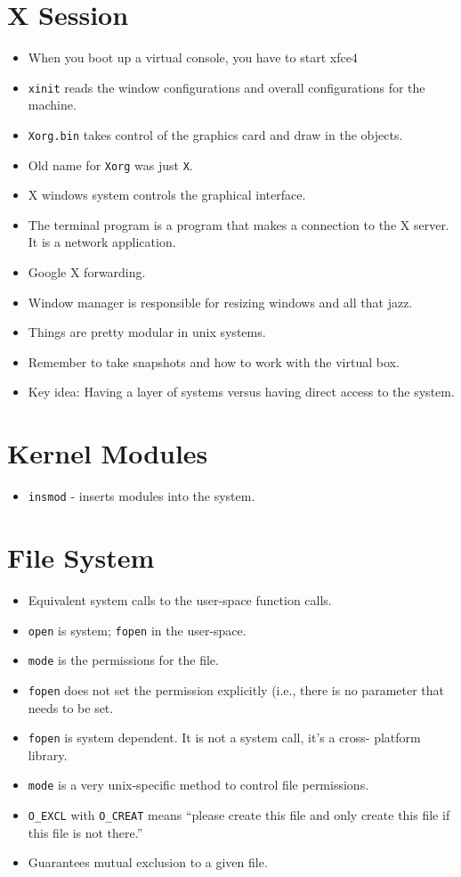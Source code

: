 \documentclass[]{article}
\newcommand{\code}{\texttt}
\begin{document}
\section*{X Session}
\begin{itemize}
\item When you boot up a virtual console, you have to start xfce4
\item \code{xinit} reads the window configurations and overall configurations
for the machine.
\item \code{Xorg.bin} takes control of the graphics card and draw in the
objects.
\item Old name for \code{Xorg} was just \code{X}.
\item X windows system controls the graphical interface.
\item The terminal program is a program that makes a connection to the X server.
It is a network application.
\item Google X forwarding.
\item Window manager is responsible for resizing windows and all that jazz.
\item Things are pretty modular in unix systems.
\item Remember to take snapshots and how to work with the virtual box.
\item Key idea: Having a layer of systems versus having direct access to the
system.
\end{itemize}

\section*{Kernel Modules}
\begin{itemize}
\item \code{insmod} - inserts modules into the system.
\end{itemize}

\section*{File System}
\begin{itemize}
\item Equivalent system calls to the user-space function calls.
\item \code{open} is system; \code{fopen} in the user-space.
\item \code{mode} is the permissions for the file.
\item \code{fopen} does not set the permission explicitly (i.e., there is no
parameter that needs to be set.
\item \code{fopen} is system dependent. It is not a system call, it's a cross-
platform library.
\item \code{mode} is a very unix-specific method to control file permissions.
\item \code{O\_EXCL} with \code{O\_CREAT} means ``please create this file and
only create this file if this file is not there.''
\item Guarantees mutual exclusion to a given file.
\end{itemize}
\end{document}
